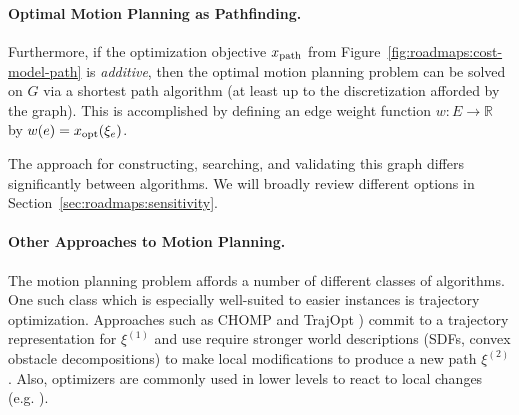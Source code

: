 \paragraph{Optimal Motion Planning as Pathfinding.}
Furthermore,
if the optimization objective $x_{\mbox{\scriptsize path}}$
from Figure~\ref{fig:roadmaps:cost-model-path} is \emph{additive},
then the optimal motion planning problem can be solved on $G$
via a shortest path algorithm
(at least up to the discretization afforded by the graph).
This is accomplished by defining an edge weight function
$w : E \rightarrow \mathbb{R}$
by $w(e) = x_{\mbox{\scriptsize opt}}(\xi_e)$.

The approach for constructing, searching, and validating this graph
differs significantly between algorithms.
We will broadly review different options in
Section~\ref{sec:roadmaps:sensitivity}.



\paragraph{Other Approaches to Motion Planning.}
The motion planning problem affords a number of different classes of
algorithms.
One such class which is especially well-suited to easier instances
is trajectory optimization.
Approaches such as CHOMP \citep{zucker2013chomp}
and TrajOpt \citep{schulman2013trajopt})
commit to a trajectory representation for $\xi^{(1)}$
and use require stronger world descriptions
(SDFs, convex obstacle decompositions)
to make local modifications
to produce a new path $\xi^{(2)}$.
Also,
optimizers are commonly used in lower levels to react to local
changes (e.g. \citep{quinlan1994modification}).

